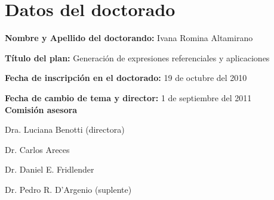 \section{Datos del doctorado}
\label{datos}

{\bf Nombre y Apellido del doctorando:} Ivana Romina Altamirano

{\bf T\'itulo del plan:} Generaci\'on de expresiones referenciales y aplicaciones

{\bf Fecha de inscripci\'on en el doctorado:} 19 de octubre del 2010

{\bf Fecha de cambio de tema y director:} 1 de septiembre del 2011\\

{\bf Comisi\'on asesora}


Dra. Luciana Benotti (directora)

Dr. Carlos Areces

Dr. Daniel E. Fridlender

Dr. Pedro R. D'Argenio (suplente)


